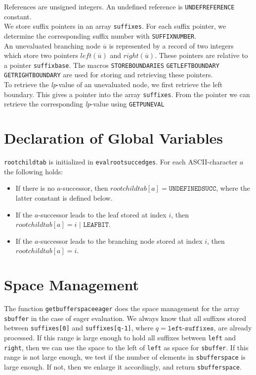 \documentclass[a4paper]{article}
\begin{document}
References are unsigned integers. An undefined reference is
\texttt{UNDEFREFERENCE} constant.\\

We store suffix pointers in an array \texttt{suffixes}. For each suffix
pointer, we determine the corresponding suffix number with
\texttt{SUFFIXNUMBER}.\\

An unevaluated branching node \(\overline{u}\) is represented by a record of
two integers which store two pointers \(\mathit{left}(\overline{u})\) and
\(\mathit{right}(\overline{u})\). These pointers are relative to a pointer
\texttt{suffixbase}. The macros \texttt{STOREBOUNDARIES}
\texttt{GETLEFTBOUNDARY} \texttt{GETRIGHTBOUNDARY} are used for storing and
retrieving these pointers.\\

To retrieve the \emph{lp}-value of an unevaluated node, we first retrieve the
left boundary. This gives a pointer into the array \texttt{suffixes}. From the
pointer we can retrieve the corresponding \emph{lp}-value using
\texttt{GETPUNEVAL}

\section{Declaration of Global Variables}

  \texttt{rootchildtab} is initialized in \texttt{evalrootsuccedges}.
  For each ASCII-character \(a\) the following holds:

  \begin{itemize}
    \item
        If there is no \(a\)-successor, then
        \(rootchildtab[a]=\texttt{UNDEFINEDSUCC}\), where the latter constant is
        defined below.
    \item
        If the \(a\)-successor leads to the leaf stored at index \(i\), then
        \(rootchildtab[a]=i\texttt{ | LEAFBIT}\).
    \item
        If the \(a\)-successor leads to the branching node stored at index \(i\),
        then \(rootchildtab[a]=i\).
  \end{itemize}

\section{Space Management}

The function \texttt{getbufferspaceeager} does the space management for the
array \texttt{sbuffer} in the case of eager evaluation. We always know that all
suffixes stored between \texttt{suffixes[0]} and \texttt{suffixes[q-1]}, where
\(q=\texttt{left-suffixes}\), are already processed. If this range is large
enough to hold all suffixes between \texttt{left} and \texttt{right}, then we
can use the space to the left of \texttt{left} as space for \texttt{sbuffer}.
If this range is not large enough, we test if the number of elements in
\texttt{sbufferspace} is large enough. If not, then we enlarge it accordingly,
and return \texttt{sbufferspace}.\\
\end{document}
